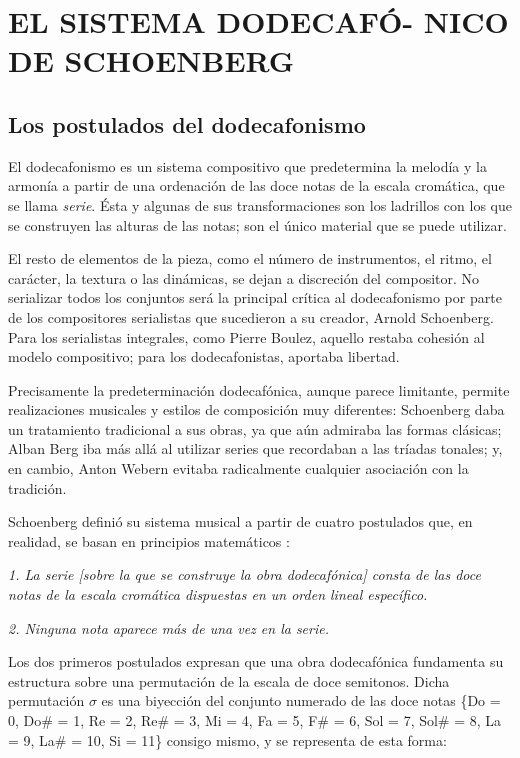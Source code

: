 \chapter[EL SISTEMA DODECAFÓNICO DE SCHOENBERG]{EL SISTEMA DODECAFÓ- NICO DE SCHOENBERG}\label{ch:dodecafonismo}
	\section{Los postulados del dodecafonismo}
		El dodecafonismo es un sistema compositivo que predetermina la melodía y la armonía a partir de una ordenación de las doce notas de la escala cromática, que se llama \textit{serie}. Ésta y algunas de sus transformaciones son los ladrillos con los que se construyen las alturas de las notas; son el único material que se puede utilizar. \cite{delgado}
		
		El resto de elementos de la pieza, como el número de instrumentos, el ritmo, el carácter, la textura o las dinámicas, se dejan a discreción del compositor. No serializar todos los conjuntos será la principal crítica al dodecafonismo por parte de los compositores serialistas que sucedieron a su creador, Arnold Schoenberg. Para los serialistas integrales, como Pierre Boulez, aquello restaba cohesión al modelo compositivo; para los dodecafonistas, aportaba libertad. \cite{boulez}
		
		Precisamente la predeterminación dodecafónica, aunque parece limitante, permite realizaciones musicales y estilos de composición muy diferentes: Schoenberg daba un tratamiento tradicional a sus obras, ya que aún admiraba las formas clásicas; Alban Berg iba más allá al utilizar series que recordaban a las tríadas tonales; y, en cambio, Anton Webern evitaba radicalmente cualquier asociación con la tradición. \cite{delgado}
		
		Schoenberg definió su sistema musical a partir de cuatro postulados que, en realidad, se basan en principios matemáticos \cite{dominguez}:
		
		\emph{1. La serie \emph{[sobre la que se construye la obra dodecafónica]} consta de las doce notas de la escala cromática dispuestas en un orden lineal específico.}
		
		\emph{2. Ninguna nota aparece más de una vez en la serie.}
		
		Los dos primeros postulados expresan que una obra dodecafónica fundamenta su estructura sobre una permutación de la escala de doce semitonos. Dicha permutación $\sigma$ es una biyección del conjunto numerado de las doce notas \{Do = 0, Do\# = 1, Re = 2, Re\# = 3, Mi = 4, Fa = 5, F\# = 6, Sol = 7, Sol\# = 8, La = 9, La\# = 10, Si = 11\} consigo mismo, y se representa de esta forma:
		
